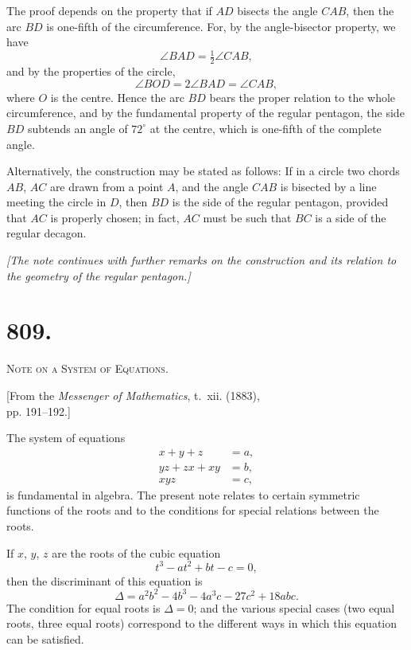 \documentclass[11pt,a4paper]{article}
\theoremstyle{definition}
\theoremstyle{remark}
\begin{document}
The proof depends on the property that if $AD$ bisects the angle $CAB$, then the arc $BD$ is one-fifth of the circumference. For, by the angle-bisector property, we have
\[
\angle BAD = \tfrac{1}{2}\angle CAB,
\]
and by the properties of the circle,
\[
\angle BOD = 2\angle BAD = \angle CAB,
\]
where $O$ is the centre. Hence the arc $BD$ bears the proper relation to the whole circumference, and by the fundamental property of the regular pentagon, the side $BD$ subtends an angle of $72^\circ$ at the centre, which is one-fifth of the complete angle.

Alternatively, the construction may be stated as follows: If in a circle two chords $AB$, $AC$ are drawn from a point $A$, and the angle $CAB$ is bisected by a line meeting the circle in $D$, then $BD$ is the side of the regular pentagon, provided that $AC$ is properly chosen; in fact, $AC$ must be such that $BC$ is a side of the regular decagon.

\vspace{0.5cm}
\noindent\textit{[The note continues with further remarks on the construction and its relation to the geometry of the regular pentagon.]}
\vspace{0.5cm}



\newpage
\section*{809.}
\begin{center}
{\large\scshape Note on a System of Equations.}
\end{center}

\begin{flushright}
\small[From the \textit{Messenger of Mathematics}, t.~xii. (1883),\\
pp. 191--192.]
\end{flushright}

The system of equations
\[
\begin{aligned}
x + y + z &= a, \\
yz + zx + xy &= b, \\
xyz &= c,
\end{aligned}
\]
is fundamental in algebra. The present note relates to certain symmetric functions of the roots and to the conditions for special relations between the roots.

If $x$, $y$, $z$ are the roots of the cubic equation
\[
t^3 - at^2 + bt - c = 0,
\]
then the discriminant of this equation is
\[
\Delta = a^2b^2 - 4b^3 - 4a^3c - 27c^2 + 18abc.
\]
The condition for equal roots is $\Delta = 0$; and the various special cases (two equal roots, three equal roots) correspond to the different ways in which this equation can be satisfied.
\end{document}
